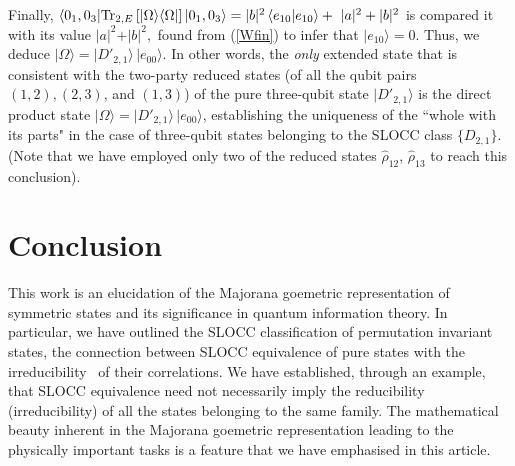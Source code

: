 \documentclass[pra,preprint,a4paper,superscriptaddress]{revtex4}
\begin{document}
{Finally,   
$\langle 0_1,0_3\vert{\rm Tr}_{2,E}\, [\vert\Omega\rangle\langle\Omega\vert]\, \vert 0_1,0_3\rangle=\vert %
b\vert^2\, \langle e_{10}\vert e_{10}\rangle+ \ \vert a\vert^2 +\vert b\vert^2$  
is  compared it with its value $\vert a\vert^2+\vert b\vert^2,$  found  from (\ref{Wfin}) to infer that  $\vert %
e_{10}\rangle=0$. 
Thus, we deduce
$\vert\Omega\rangle=\vert D'_{2,1}\rangle\, \vert e_{00}\rangle.$
In other words, the {\em only} extended state  that is consistent 
with the two-party reduced states (of all the qubit pairs $(1,2), (2,3)$, 
and $(1,3)$)  of the pure three-qubit state $\vert D'_{2,1}\rangle$ is the direct product state  
$\vert\Omega\rangle=\vert D'_{2,1}\rangle\, \vert e_{00}\rangle$,  establishing  the uniqueness of the ``whole 
with its parts" in the case of three-qubit states belonging to the SLOCC class $\{D_{2,1}\}$. (Note that we have  
employed only two  of the reduced states $\hat{\rho}_{12}$, $\hat{\rho}_{13}$ to reach this conclusion).         






\section{Conclusion}
This work is an elucidation of the Majorana goemetric representation of symmetric states and its significance in quantum information theory. In particular, we have outlined the SLOCC classification of permutation invariant states, the connection between SLOCC equivalence of pure states with the 
irreducibility~\cite{SP1,SP2,SP2b} of their correlations. We have established, through an example, that SLOCC equivalence need not necessarily imply 
the reducibility (irreducibility) of all the states belonging to the same family. The  mathematical beauty inherent in the Majorana goemetric representation leading to the physically important tasks is a feature that we have emphasised in this article. 

 

}
\end{document}
